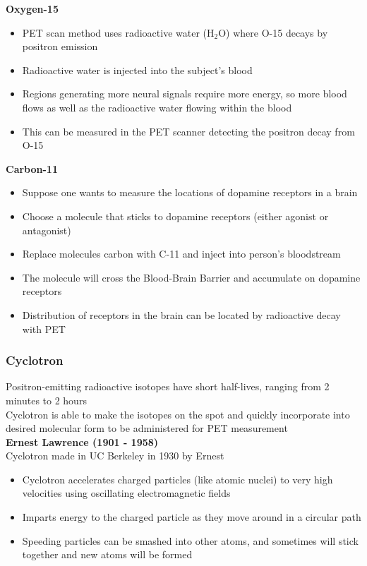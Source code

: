 \documentclass{article}
\begin{document}
\noindent \textbf{Oxygen-15}
\begin{itemize}
    \item PET scan method uses radioactive water (H$_2$O) where O-15 decays by positron emission
    \item Radioactive water is injected into the subject's blood 
    \item Regions generating more neural signals require more energy, so more blood flows as well as the radioactive water flowing within the blood
    \item This can be measured in the PET scanner detecting the positron decay from O-15
\end{itemize}

\newpage
\noindent \textbf{Carbon-11}
\begin{itemize}
    \item Suppose one wants to measure the locations of dopamine receptors in a brain 
    \item Choose a molecule that sticks to dopamine receptors (either agonist or antagonist)
    \item Replace molecules carbon with C-11 and inject into person's bloodstream
    \item The molecule will cross the Blood-Brain Barrier and accumulate on dopamine receptors 
    \item Distribution of receptors in the brain can be located by radioactive decay with PET
\end{itemize}

\subsubsection{Cyclotron}
Positron-emitting radioactive isotopes have short half-lives, ranging from 2 minutes to 2 hours \\

\noindent Cyclotron is able to make the isotopes on the spot and quickly incorporate into desired molecular form to be administered for PET measurement \\

\noindent \textbf{Ernest Lawrence (1901 - 1958)}\\
Cyclotron made in UC Berkeley in 1930 by Ernest 

\begin{itemize}
    \item Cyclotron accelerates charged particles (like atomic nuclei) to very high velocities using oscillating electromagnetic fields
    \item Imparts energy to the charged particle as they move around in a circular path
    \item Speeding particles can be smashed into other atoms, and sometimes will stick together and new atoms will be formed
\end{itemize}
\end{document}
